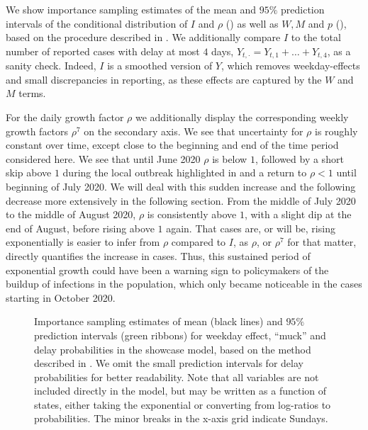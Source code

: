 We show importance sampling estimates of the mean and $95\%$ prediction intervals of the conditional distribution of $I$ and $\rho$ () as well as $W,M$ and $p$ (), based on the procedure described in . We additionally compare $I$ to the total number of reported cases with delay at most $4$ days, $Y_{t,\cdot} = Y_{t, 1} + \dots + Y_{t, 4}$, as a sanity check. Indeed, $I$ is a smoothed version of $Y$, which removes weekday-effects and small discrepancies in reporting, as these effects are captured by the $W$ and $M$ terms.

For the daily growth factor $\rho$ we additionally display the corresponding weekly growth factors $\rho^{7}$ on the secondary axis. We see that uncertainty for $\rho$ is roughly constant over time, except close to the beginning and end of the time period considered here. We see that until June 2020 $\rho$ is below $1$, followed by a short skip above $1$ during the local outbreak highlighted in  and a return to $\rho < 1$ until beginning of July 2020. We will deal with this sudden increase and the following decrease more extensively in the following section. From the middle of July 2020 to the middle of August 2020, $\rho$ is consistently above $1$, with a slight dip at the end of August, before rising above $1$ again. That cases are, or will be, rising exponentially is easier to infer from $\rho$ compared to $I$, as $\rho$, or $\rho^7$ for that matter, directly quantifies the increase in cases. Thus, this sustained period of exponential growth could have been a warning sign to policymakers of the buildup of infections in the population, which only became noticeable in the cases starting in October 2020. 

\begin{figure}
    \resizebox{\textwidth}{!}{%
    }
    \caption{Importance sampling estimates of mean (black lines) and $95\%$ prediction intervals (green ribbons) for weekday effect, ``{}muck''{} and delay probabilities in the showcase model, based on the method described in . We omit the small prediction intervals for delay probabilities for better readability. Note that all variables are not included directly in the model, but may be written as a function of states, either taking the exponential or converting from log-ratios to probabilities. The minor breaks in the x-axis grid indicate Sundays.} \label{fig:showcase_prediction_intervals}
\end{figure}

